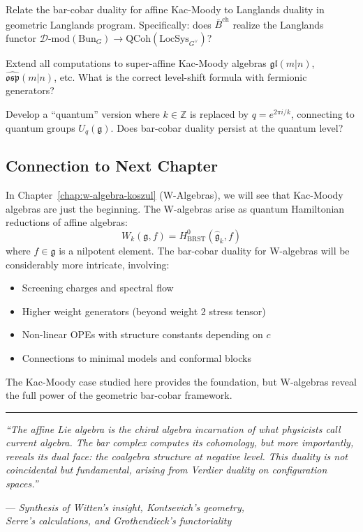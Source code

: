 \begin{openproblem}[4]
Relate the bar-cobar duality for affine Kac-Moody to Langlands duality in geometric Langlands program. Specifically: does $\bar{B}^{\text{ch}}$ realize the Langlands functor $\mathscr{D}\text{-mod}(\text{Bun}_G) \to \text{QCoh}(\text{LocSys}_{G^\vee})$?
\end{openproblem}

\begin{openproblem}[5]
Extend all computations to super-affine Kac-Moody algebras $\widehat{\mathfrak{gl}}(m|n)$, $\widehat{\mathfrak{osp}}(m|n)$, etc. What is the correct level-shift formula with fermionic generators?
\end{openproblem}

\begin{openproblem}[6]
Develop a ``quantum'' version where $k \in \mathbb{Z}$ is replaced by $q = e^{2\pi i/k}$, connecting to quantum groups $U_q(\mathfrak{g})$. Does bar-cobar duality persist at the quantum level?
\end{openproblem}

\subsection{Connection to Next Chapter}

In Chapter~\ref{chap:w-algebra-koszul} (W-Algebras), we will see that Kac-Moody algebras are just the beginning. The W-algebras arise as quantum Hamiltonian reductions of affine algebras:
$$W_k(\mathfrak{g}, f) = H^0_{\text{BRST}}(\widehat{\mathfrak{g}}_k, f)$$
where $f \in \mathfrak{g}$ is a nilpotent element. The bar-cobar duality for W-algebras will be considerably more intricate, involving:
\begin{itemize}
\item Screening charges and spectral flow
\item Higher weight generators (beyond weight 2 stress tensor)
\item Non-linear OPEs with structure constants depending on $c$
\item Connections to minimal models and conformal blocks
\end{itemize}

The Kac-Moody case studied here provides the foundation, but W-algebras reveal the full power of the geometric bar-cobar framework.

\bigskip

\begin{center}
\rule{0.5\textwidth}{0.4pt}

\textit{``The affine Lie algebra is the chiral algebra incarnation of what physicists call current algebra. The bar complex computes its cohomology, but more importantly, reveals its dual face: the coalgebra structure at negative level. This duality is not coincidental but fundamental, arising from Verdier duality on configuration spaces.''} 

— \textit{Synthesis of Witten's insight, Kontsevich's geometry, \\Serre's calculations, and Grothendieck's functoriality}
\end{center}

